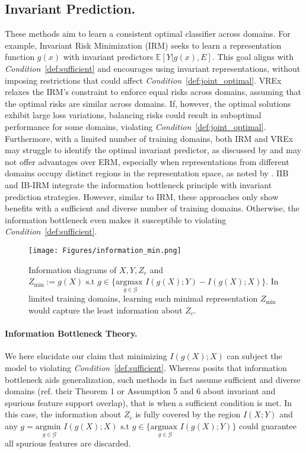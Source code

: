 \subsection{Invariant Prediction.} These methods aim to learn a consistent optimal classifier across domains. For example, Invariant Risk Minimization (IRM) \citep{arjovsky2020irm} seeks to learn a representation function $g(x)$ with invariant predictors $\mathbb{E}[Y | g(x), E]$. This goal aligns with \textit{Condition}~\ref{def:sufficient} and encourages using invariant representations, without imposing restrictions that could affect \textit{Condition}~\ref{def:joint_optimal}. VREx \citep{krueger2021out} relaxes the IRM's constraint to enforce equal risks across domains, assuming that the optimal risks are similar across domains. If, however, the optimal solutions exhibit large loss variations, balancing risks could result in suboptimal performance for some domains, violating \textit{Condition}~\ref{def:joint_optimal}. Furthermore, with a limited number of training domains, both IRM and VREx may struggle to identify the optimal invariant predictor, as discussed by \citet{rosenfeld2020risks} and may not offer advantages over ERM, especially when representations from different domains occupy distinct regions in the representation space, as noted by \citep{ahuja2020empirical}. IIB \citep{li2022invariant} and IB-IRM \citep{ahuja2021invariance} integrate the information bottleneck principle with invariant prediction strategies. However, similar to IRM, these approaches only show benefits with a sufficient and diverse number of training domains. Otherwise, the information bottleneck even makes it susceptible to violating \textit{Condition}~\ref{def:sufficient}. 
\begin{figure}[h!]
    \centering
\texttt{[image: Figures/information\_min.png]}
    \caption{Information diagrams of $X,Y,Z_c$ and $Z_{\text{min}} := g(X) \text{ s.t } g \in \{\underset{g\in \mathcal{G}}{\text{argmax }} I(g(X);Y) - I(g(X); X)\}$. In limited training domains, learning such minimal representation $Z_{\text{min}}$ would capture the least information about $Z_c$.}
    \label{fig:info_min}
\end{figure}

\paragraph{Information Bottleneck Theory.} We here  elucidate our claim that minimizing $I(g(X); X)$ can subject the model to violating \textit{Condition}~\ref{def:sufficient}. Whereas \cite{ahuja2021invariance} posits that information bottleneck aids generalization, such methods in fact assume sufficient and diverse domains (ref. their Theorem 1 or Assumption 5 and 6 about invariant and spurious feature support overlap), that is when a sufficient condition is met. In this case, the information about $Z_c$ is fully covered by the region $I(X;Y)$ and any $g = \underset{g\in \mathcal{G}}{\text{argmin }} I(g(X);X) \text{ s.t } g \in \{\underset{g\in \mathcal{G}}{\text{argmax }}I(g(X);Y)\}$ could guarantee all spurious features are discarded.



